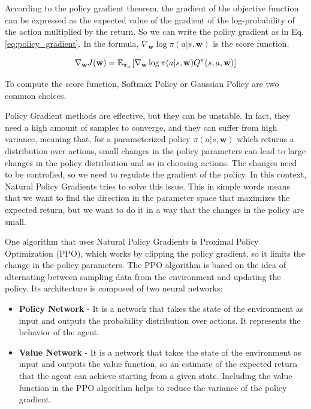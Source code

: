 According to the policy gradient theorem, the gradient of the objective function can be expressed as the expected value of the gradient of the log-probability of the action multiplied by the return.
So we can write the policy gradient as in Eq. \ref{eq:policy_gradient}.
In the formula, $\nabla_{\textbf{w}} \log \pi(a|s, \textbf{w})$ is the score function.

\begin{equation} \label{eq:policy_gradient}
    \nabla_{\textbf{w}} J(\textbf{w}) = \operatorname{\mathbb{E}}_{\pi_w}[\nabla_{\textbf{w}} \log \pi(a|s, \textbf{w}) Q^{\pi}(s, a, \textbf{w})]
\end{equation}


To compute the score function, Softmax Policy or Gaussian Policy are two common choices.

Policy Gradient methods are effective, but they can be unstable.
In fact, they need a high amount of samples to converge, and they can suffer from high variance, meaning that, for a parameterized policy $\pi(a|s, \textbf{w})$ which returns a distribution over actions, small changes in the policy parameters can lead to large changes in the policy distribution and so in choosing actions.
The changes need to be controlled, so we need to regulate the gradient of the policy.
In this context, Natural Policy Gradients tries to solve this issue.
This in simple words means that we want to find the direction in the parameter space that maximizes the expected return, but we want to do it in a way that the changes in the policy are small.


One algorithm that uses Natural Policy Gradients is Proximal Policy Optimization (PPO), which works by clipping the policy gradient, so it limits the change in the policy parameters.
The PPO algorithm is based on the idea of alternating between sampling data from the environment and updating the policy.
Its architecture is composed of two neural networks:

\begin{itemize}
    \item \textbf{Policy Network} - It is a network that takes the state of the environment as input and outputs the probability distribution over actions.
    It represents the behavior of the agent.
    \item \textbf{Value Network} - It is a network that takes the state of the environment as input and outputs the value function, so an estimate of the expected return that the agent can achieve starting from a given state.
    Including the value function in the PPO algorithm helps to reduce the variance of the policy gradient.
\end{itemize}

